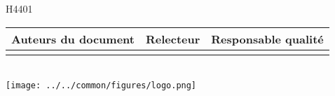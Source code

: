 \begin{titlepage}
H4401\\[1cm]


\begin{tabular}{|m{}|m{}|m{}|}
  \hline
  \textbf{Auteurs du document} & \textbf{Relecteur} & \textbf{Responsable qualité} \\
  \hline
   & & \rule[0cm]{0cm}{5cm} \\
  \hline
\end{tabular} \\[2cm]

\texttt{[image: ../../common/figures/logo.png]}

\vfill %

\end{titlepage}

